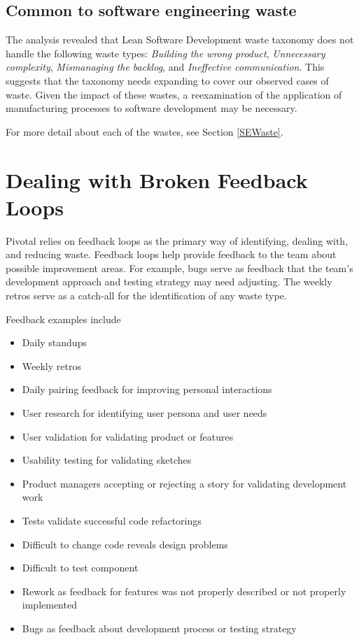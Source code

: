 \subsection{Common to software engineering waste}
The analysis revealed that Lean Software Development waste taxonomy does not handle the following waste types: \textit{Building the wrong product}, \textit{Unnecessary complexity}, \textit{Mismanaging the backlog}, and \textit{Ineffective communication}. This suggests that the taxonomy needs expanding to cover our observed cases of waste. Given the impact of these wastes, a reexamination of the application of manufacturing processes to software development may be necessary.

For more detail about each of the wastes, see Section \ref{SEWaste}.

\section{Dealing with Broken Feedback Loops}
\label{BrokenFeedbackLoops}
Pivotal relies on feedback loops as the primary way of identifying, dealing with, and reducing waste. Feedback loops help provide feedback to the team about possible improvement areas.
For example, bugs serve as feedback that the team's development approach and testing strategy may need adjusting. The weekly retros serve as a catch-all for the identification of any waste type.

Feedback examples include
\begin{itemize}
  \item Daily standups
  \item Weekly retros
  \item Daily pairing feedback for improving personal interactions
  \item User research for identifying user persona and user needs
  \item User validation for validating product or features
  \item Usability testing for validating sketches
  \item Product managers accepting or rejecting a story for validating development work
  \item Tests validate successful code refactorings 
  \item Difficult to change code reveals design problems
  \item Difficult to test component
  \item Rework as feedback for features was not properly described or not properly implemented
  \item Bugs as feedback about development process or testing strategy 
\end{itemize}

